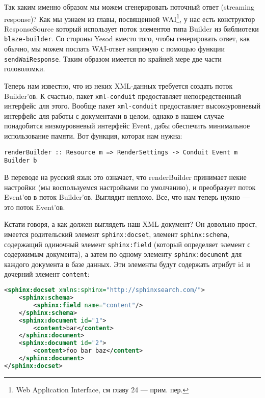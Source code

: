 Так каким именно образом мы можем сгенерировать поточный ответ (streaming response)? Как мы узнаем из главы, посвященной WAI\footnote{Web Application Interface, см главу 24 --- прим. пер.}, у нас есть конструктор ResponseSource который использует поток элементов типа Builder из библиотеки \lstinline'blaze-builder'. Со стороны Yesod вместо того, чтобы генерировать ответ, как обычно, мы можем послать WAI-ответ напрямую с помощью функции \lstinline'sendWaiResponse'. Таким образом имеется по крайней мере две части головоломки. %

Теперь нам известно, что из неких XML-данных требуется создать поток Builder'ов. К счастью, пакет \lstinline'xml-conduit' предоставляет непосредственный интерфейс для этого. Вообще пакет \lstinline'xml-conduit' предоставляет высокоуровневый интерфейс для работы с документами в целом, однако в нашем случае понадобится низкоуровневый интерфейс Event, дабы обеспечить минимальное использование памяти. Вот функция, которая нам нужна:

\begin{lstlisting}
renderBuilder :: Resource m => RenderSettings -> Conduit Event m Builder b
\end{lstlisting}

В переводе на русский язык это означает, что renderBuilder принимает некие настройки (мы воспользуемся настройками по умолчанию), и преобразует поток Event'ов в поток Builder'ов. Выглядит неплохо. Все, что нам теперь нужно --- это поток Event'ов.

Кстати говоря, а как должен выглядеть наш XML-документ? Он довольно прост, имеется родительский элемент \lstinline'sphinx:docset', элемент \lstinline'sphinx:schema', содержащий одиночный элемент \lstinline'sphinx:field' (который определяет элемент с содержимым документа), а затем по одному элементу \lstinline'sphinx:document' для каждого документа в базе данных. Эти элементы будут содержать атрибут id и дочерний элемент \lstinline'content':

\begin{lstlisting}[language=XML]
<sphinx:docset xmlns:sphinx="http://sphinxsearch.com/">
    <sphinx:schema>
        <sphinx:field name="content"/>
    </sphinx:schema>
    <sphinx:document id="1">
        <content>bar</content>
    </sphinx:document>
    <sphinx:document id="2">
        <content>foo bar baz</content>
    </sphinx:document>
</sphinx:docset>
\end{lstlisting}

